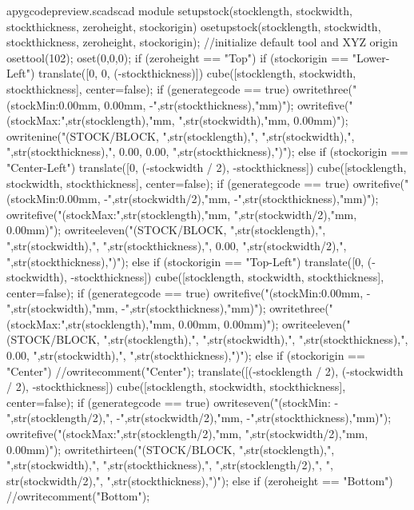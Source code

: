 \documentclass{ltxdoc}
\begin{document}
\lstset{firstnumber=\thepyscad}
\begin{writecode}{a}{pygcodepreview.scad}{scad}
module setupstock(stocklength, stockwidth, stockthickness, zeroheight, stockorigin) {
  osetupstock(stocklength, stockwidth, stockthickness, zeroheight, stockorigin);
//initialize default tool and XYZ origin
  osettool(102);
  oset(0,0,0);
  if (zeroheight == "Top") {
    if (stockorigin == "Lower-Left") {
    translate([0, 0, (-stockthickness)]){
    cube([stocklength, stockwidth, stockthickness], center=false);
      if (generategcode == true) {
      owritethree("(stockMin:0.00mm, 0.00mm, -",str(stockthickness),"mm)");
      owritefive("(stockMax:",str(stocklength),"mm, ",str(stockwidth),"mm, 0.00mm)");
      owritenine("(STOCK/BLOCK, ",str(stocklength),", ",str(stockwidth),", ",str(stockthickness),", 0.00, 0.00, ",str(stockthickness),")");
    }
  }
}
     else if (stockorigin == "Center-Left") {
    translate([0, (-stockwidth / 2), -stockthickness]){
      cube([stocklength, stockwidth, stockthickness], center=false);
    if (generategcode == true) {
owritefive("(stockMin:0.00mm, -",str(stockwidth/2),"mm, -",str(stockthickness),"mm)");
owritefive("(stockMax:",str(stocklength),"mm, ",str(stockwidth/2),"mm, 0.00mm)");
    owriteeleven("(STOCK/BLOCK, ",str(stocklength),", ",str(stockwidth),", ",str(stockthickness),", 0.00, ",str(stockwidth/2),", ",str(stockthickness),")");
    }
    }
    } else if (stockorigin == "Top-Left") {
    translate([0, (-stockwidth), -stockthickness]){
      cube([stocklength, stockwidth, stockthickness], center=false);
if (generategcode == true) {
owritefive("(stockMin:0.00mm, -",str(stockwidth),"mm, -",str(stockthickness),"mm)");
owritethree("(stockMax:",str(stocklength),"mm, 0.00mm, 0.00mm)");
owriteeleven("(STOCK/BLOCK, ",str(stocklength),", ",str(stockwidth),", ",str(stockthickness),", 0.00, ",str(stockwidth),", ",str(stockthickness),")");
    }
    }
    }
	else if (stockorigin == "Center") {
//owritecomment("Center");
    translate([(-stocklength / 2), (-stockwidth / 2), -stockthickness]){
      cube([stocklength, stockwidth, stockthickness], center=false);
if (generategcode == true) {
owriteseven("(stockMin: -",str(stocklength/2),", -",str(stockwidth/2),"mm, -",str(stockthickness),"mm)");
owritefive("(stockMax:",str(stocklength/2),"mm, ",str(stockwidth/2),"mm, 0.00mm)");
owritethirteen("(STOCK/BLOCK, ",str(stocklength),", ",str(stockwidth),", ",str(stockthickness),", ",str(stocklength/2),", ", str(stockwidth/2),", ",str(stockthickness),")");
}
}
}
} else if (zeroheight == "Bottom") {
//owritecomment("Bottom");
}}
\end{writecode}
\end{document}
